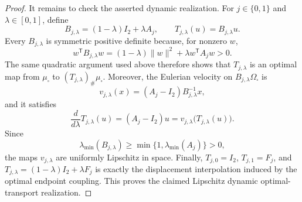 \documentclass{article}
\begin{document}
\begin{proof}
It remains to check the asserted dynamic realization.  For \(j\in\{0,1\}\) and \(\lambda\in[0,1]\), define
\[
B_{j,\lambda}=(1-\lambda)I_2+\lambda A_j,
\qquad T_{j,\lambda}(u)=B_{j,\lambda}u.
\]
Every \(B_{j,\lambda}\) is symmetric positive definite because, for nonzero \(w\),
\[
w^{\mathsf T}B_{j,\lambda}w
=(1-\lambda)\lVert w\rVert^2
 +\lambda w^{\mathsf T}A_jw>0.
\]
The same quadratic argument used above therefore shows that \(T_{j,\lambda}\) is an optimal map from \(\mu_{\square}\) to \((T_{j,\lambda})_{\#}\mu_{\square}\).  Moreover, the Eulerian velocity on \(B_{j,\lambda}\Omega_{\square}\) is
\[
v_{j,\lambda}(x)=(A_j-I_2)B_{j,\lambda}^{-1}x,
\]
and it satisfies
\[
\frac{d}{d\lambda}T_{j,\lambda}(u)
=(A_j-I_2)u
=v_{j,\lambda}\bigl(T_{j,\lambda}(u)\bigr).
\]
Since
\[
\lambda_{\min}(B_{j,\lambda})
\ge \min\{1,\lambda_{\min}(A_j)\}>0,
\]
the maps \(v_{j,\lambda}\) are uniformly Lipschitz in space.  Finally, \(T_{j,0}=I_2\), \(T_{j,1}=F_j\), and \(T_{j,\lambda}=(1-\lambda)I_2+\lambda F_j\) is exactly the displacement interpolation induced by the optimal endpoint coupling.  This proves the claimed Lipschitz dynamic optimal-transport realization.


\end{proof}
\end{document}

